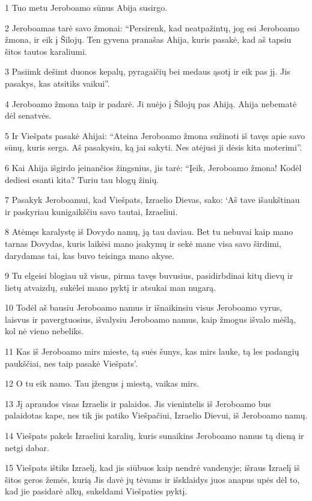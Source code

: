 \par 1 Tuo metu Jeroboamo sūnus Abija susirgo. 
\par 2 Jeroboamas tarė savo žmonai: “Persirenk, kad neatpažintų, jog esi Jeroboamo žmona, ir eik į Šilojų. Ten gyvena pranašas Ahija, kuris pasakė, kad aš tapsiu šitos tautos karaliumi. 
\par 3 Pasiimk dešimt duonos kepalų, pyragaičių bei medaus ąsotį ir eik pas jį. Jis pasakys, kas atsitiks vaikui”. 
\par 4 Jeroboamo žmona taip ir padarė. Ji nuėjo į Šilojų pas Ahiją. Ahija nebematė dėl senatvės. 
\par 5 Ir Viešpats pasakė Ahijai: “Ateina Jeroboamo žmona sužinoti iš tavęs apie savo sūnų, kuris serga. Aš pasakysiu, ką jai sakyti. Nes atėjusi ji dėsis kita moterimi”. 
\par 6 Kai Ahija išgirdo įeinančios žingsnius, jis tarė: “Įeik, Jeroboamo žmona! Kodėl dediesi esanti kita? Turiu tau blogų žinių. 
\par 7 Pasakyk Jeroboamui, kad Viešpats, Izraelio Dievas, sako: ‘Aš tave išaukštinau ir paskyriau kunigaikščiu savo tautai, Izraeliui. 
\par 8 Atėmęs karalystę iš Dovydo namų, ją tau daviau. Bet tu nebuvai kaip mano tarnas Dovydas, kuris laikėsi mano įsakymų ir sekė mane visa savo širdimi, darydamas tai, kas buvo teisinga mano akyse. 
\par 9 Tu elgeisi blogiau už visus, pirma tavęs buvusius, pasidirbdinai kitų dievų ir lietų atvaizdų, sukėlei mano pyktį ir atsukai man nugarą. 
\par 10 Todėl aš bausiu Jeroboamo namus ir išnaikinsiu visus Jeroboamo vyrus, laisvus ir pavergtuosius, išvalysiu Jeroboamo namus, kaip žmogus išvalo mėšlą, kol nė vieno nebeliks. 
\par 11 Kas iš Jeroboamo mirs mieste, tą suės šunys, kas mirs lauke, tą les padangių paukščiai, nes taip pasakė Viešpats’. 
\par 12 O tu eik namo. Tau įžengus į miestą, vaikas mirs. 
\par 13 Jį apraudos visas Izraelis ir palaidos. Jis vienintelis iš Jeroboamo bus palaidotas kape, nes tik jis patiko Viešpačiui, Izraelio Dievui, iš Jeroboamo namų. 
\par 14 Viešpats pakels Izraeliui karalių, kuris sunaikins Jeroboamo namus tą dieną ir netgi dabar. 
\par 15 Viešpats ištiks Izraelį, kad jis siūbuos kaip nendrė vandenyje; išraus Izraelį iš šitos geros žemės, kurią Jis davė jų tėvams ir išsklaidys juos anapus upės dėl to, kad jie pasidarė alkų, sukeldami Viešpaties pyktį. 
